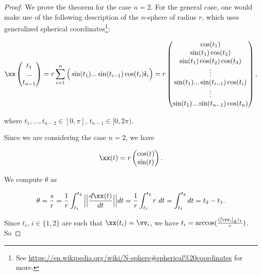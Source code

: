 \begin{proof}
   We prove the theorem for the case $n = 2$. For the general case, one would make use of the following description of the $n$-sphere of radius $r$, which uses generalized spherical coordinates\footnote{See \url{https://en.wikipedia.org/wiki/N-sphere\#spherical\%20coordinates} for more.}:
   
   \begin{align*}
       \xx \begin{pmatrix} t_1 \\ ... \\ t_{n - 1} \end{pmatrix}
       =
       r \sum_{i = 1}^n \Big( \sin(t_1) ... \sin(t_{i - 1}) \cos(t_i) \see_i \Big)
       =
       r
       \begin{pmatrix}
            \cos(t_1) \\
            \sin(t_1) \cos(t_2) \\
            \sin(t_1) \cos(t_2) \cos(t_3) \\
            \vdots \\
            \sin(t_1) ... \sin(t_{i - 1}) \cos(t_i) \\
            \vdots \\
            \sin(t_1) ... \sin(t_{n - 1}) \cos(t_n)
       \end{pmatrix},
   \end{align*}
   
   where $t_1, ..., t_{n - 2} \in [0, \pi]$, $t_{n - 1} \in [0, 2\pi)$.
   
   Since we are considering the case $n = 2$, we have
   
   \begin{align*}
       \xx(t) = r \begin{pmatrix} \cos(t) \\ \sin(t) \end{pmatrix}.
   \end{align*}
   
   We compute $\theta$ as
   
   \begin{align*}
       \theta = \frac{s}{r} = \frac{1}{r} \int_{t_1}^{t_2} \Big|\Big| \frac{d \xx(t)}{dt} \Big|\Big| dt = \frac{1}{r} \int_{t_1}^{t_2} r \spc dt = \int_{t_1}^{t_2} dt = t_2 - t_1.
   \end{align*}
   
   Since $t_i$, $i \in \{1, 2\}$ are such that $\xx(t_i) = \vv_i$, we have $t_i = \text{arccos}(\frac{([\vv_i]_\sE)_1}{r})$. So
   

\end{proof}
